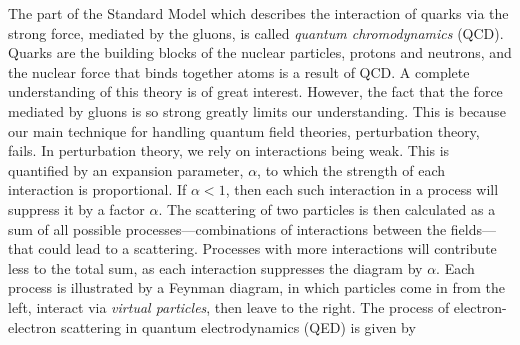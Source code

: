 The part of the Standard Model which describes the interaction of quarks via the strong force, mediated by the gluons, is called \emph{quantum chromodynamics} (QCD).
Quarks are the building blocks of the nuclear particles, protons and neutrons, and the nuclear force that binds together atoms is a result of QCD.
A complete understanding of this theory is of great interest.
However, the fact that the force mediated by gluons is so strong greatly limits our understanding.
This is because our main technique for handling quantum field theories, perturbation theory, fails.
In perturbation theory, we rely on interactions being weak.
This is quantified by an expansion parameter, $\alpha$, to which the strength of each interaction is proportional.
If $\alpha<1$, then each such interaction in a process will suppress it by a factor $\alpha$.
The scattering of two particles is then calculated as a sum of all possible processes---combinations of interactions between the fields---that could lead to a scattering.
Processes with more interactions will contribute less to the total sum, as each interaction suppresses the diagram by $\alpha$.
Each process is illustrated by a Feynman diagram, in which particles come in from the left, interact via \emph{virtual particles}, then leave to the right.
The process of electron-electron scattering in quantum electrodynamics (QED) is given by
%
